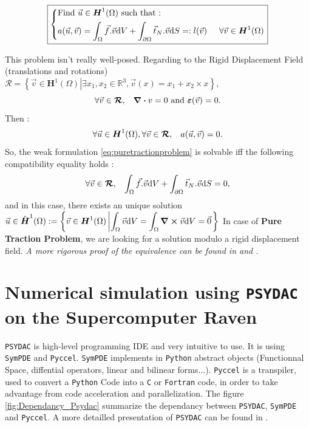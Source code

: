 \documentclass[a4paper,12pt,twoside]{report}
\newcommand{\mtr}{\mathbb{R}}
\newcommand{\dif}{\mathrm{d}}
\begin{document}
\begin{equation}
\label{eq:puretractionproblem}
\boxed{
\left\{
    \begin{aligned}
    &\text{Find } \vec u \in \boldsymbol H^1(\Omega) \text{ such that :}\\
    & a(\vec u,\vec v) = \int_\Omega \vec f . \vec v \dif V + \int_{\partial\Omega} \vec t_N.\vec v \dif S =:l(\vec v) \hspace{0.5cm} \forall \vec v \in \boldsymbol H^1(\Omega)
    \end{aligned}
\right.
}
\end{equation}

This problem isn't really well-posed. Regarding to the Rigid Displacement Field (translations and rotations) $\boldsymbol{\mathcal{R}} = \left\{\vec v \in \boldsymbol H^1(\Omega) \left| \exists x_1, x_2 \in \mtr^3, \vec v(x) = x_1 + x_2 \times x \right. \right\}$, $$\forall \vec v \in \boldsymbol{\mathcal{R}}, \hspace{0.3cm} \div v = 0 \text{ and } \boldsymbol \varepsilon(\vec v) = 0.$$
Then : $$\forall \vec u \in \boldsymbol H^1(\Omega), \forall \vec v \in \boldsymbol{\mathcal{R}},\hspace{0.3cm} a(\vec u, \vec v)= 0.$$
So, the weak formulation \eqref{eq:puretractionproblem} is solvable iff the following compatibility equality holds : $$\forall \vec v \in \boldsymbol{\mathcal{R}}, \hspace{0.3cm}\int_\Omega \vec f . \vec v \dif V + \int_{\partial\Omega} \vec t_N.\vec v \dif S = 0,$$
and in this case, there exists an unique solution $\vec u \in \hat{\boldsymbol H}^1(\Omega) := \left\{\vec v \in \boldsymbol H^1(\Omega) \left| \displaystyle \int_\Omega \vec v \dif V = \int_\Omega  \curl \vec v \dif V = \vec 0 \right. \right\}$ 
In case of \textbf{Pure Traction Problem}, we are looking for a solution modulo a rigid displacement field.
\textit{A more rigorous proof of the equivalence can be found in \cite{brenner_mathematical_2008} and \cite{chen_variational}.}


\section{Numerical simulation using \texttt{PSYDAC} on the Supercomputer Raven}

\texttt{PSYDAC} is high-level programming IDE and very intuitive to use. It is using \texttt{SymPDE} and \texttt{Pyccel}. \texttt{SymPDE} implements in \texttt{Python} abstract objects (Functionnal Space, diffential operators, linear and bilinear forms...). \texttt{Pyccel} is a transpiler, used to convert a \texttt{Python} Code into a \texttt{C} or \texttt{Fortran} code, in order to take advantage from code acceleration and parallelization. The figure \ref{fig:Dependancy_Psydac} summarize the dependancy between \texttt{PSYDAC}, \texttt{SymPDE} and \texttt{Pyccel}. A more detailled presentation of \texttt{PSYDAC} can be found in \cite{guclu_psydac_2022}.
\newpage 
\end{document}
